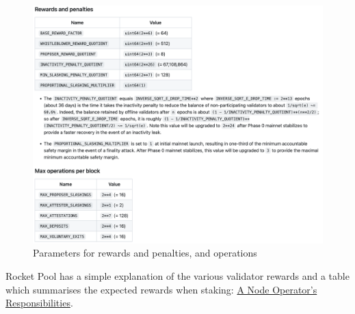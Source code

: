 \documentclass[UTF8]{article}
\begin{document}
 \begin{figure}[htbp]
\begin{center}
\includegraphics[width=\linewidth]{images/rewards}
\caption{Parameters for rewards and penalties, and operations}
\label{fig:rewards}
\end{center}
\end{figure}

Rocket Pool has a simple explanation of the various validator rewards and a table which summarises the expected rewards when staking: \href{https://docs.rocketpool.net/guides/node/responsibilities.html}{A Node Operator's Responsibilities}.
\clearpage
\end{document}
